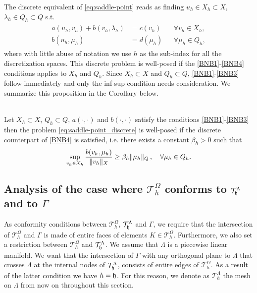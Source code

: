 \documentclass[r]{siamart171218}
\newcommand{\kent}[1]{{\color{black}#1}}
\begin{document}
The discrete equivalent of \eqref{eq:saddle-point} reads as finding $u_h\in X_h\subset X$, $\lambda_h\in Q_h\subset Q$ s.t.
\begin{eqnarray}\label{eq:saddle-point_discrete}
\begin{aligned}
a(u_h,v_h)+b(v_h,\lambda_h)&=c(v_h) &&\forall v_h\in X_h,\\
b(u_h,\mu_h)&=d(\mu_h) &&\forall \mu_h\in Q_h,
\end{aligned}
\end{eqnarray}
where with little abuse of notation we use $h$ as the sub-index for all the discretization spaces.
This discrete problem is well-posed if the \eqref{BNB1}-\eqref{BNB4} conditions applies to $X_h$ and $Q_h$. Since $X_h\subset X$ and $Q_h\subset Q$,  
\eqref{BNB1}-\eqref{BNB3} follow immediately and only the inf-sup condition needs consideration.  We summarize this proposition in the Corollary below. 
\begin{corollary}{\cite[Theorem 2.42]{MR2050138}}\\
Let
$X_h \subset X$, $Q_h \subset Q$, $a(\cdot, \cdot)$ and $b(\cdot, \cdot)$ satisfy the conditions  \eqref{BNB1}-\eqref{BNB3} then  
the problem \eqref{eq:saddle-point_discrete} is well-posed if 
the discrete counterpart of \eqref{BNB4} is satisfied, i.e.
there exists a constant $\beta_h>0$ such that
\begin{align}
\label{eq:infsup_discrete}
 \sup_{v_h\in X_h} \frac{b(v_h,\mu_h)}{\|v_h\|_{X}}\geq \beta_h \|\mu_h\|_{Q}\,, \kent{\quad \forall \mu_h \in Q_h.}
\end{align}
\end{corollary}


\subsection{Analysis of the case where $\mathcal{T}^{\Omega}_h$ conforms to $\mathcal{T}^{\Lambda}_{\mathfrak{h}}$ and to $\Gamma$}
As conformity conditions between $\mathcal{T}^{\Omega}_h$, $\mathcal{T}^{\Lambda}_{\mathfrak{h}}$ and $\Gamma$, we require that the intersection of $\mathcal{T}^{\Omega}_h$ and $\Gamma$ is made of entire faces of elements $K \in \mathcal{T}^{\Omega}_h$. Furthermore, we also set a restriction between $\mathcal{T}^{\Omega}_h$ and $\mathcal{T}^{\Lambda}_{\mathfrak{h}}$. We assume that $\Lambda$ is a piecewise linear manifold. We want that the intersection of $\Gamma$ with any orthogonal plane to $\Lambda$ that crosses $\Lambda$ at the internal nodes of $\mathcal{T}^{\Lambda}_{\mathfrak{h}}$, consists of entire edges of $\mathcal{T}^{\Omega}_h$. As a result of the latter condition we have $h=\mathfrak{h}$. 
For this reason, we denote as $\mathcal{T}^{\Lambda}_h$ the mesh on $\Lambda$
from now on throughout this section.
 
\end{document}
